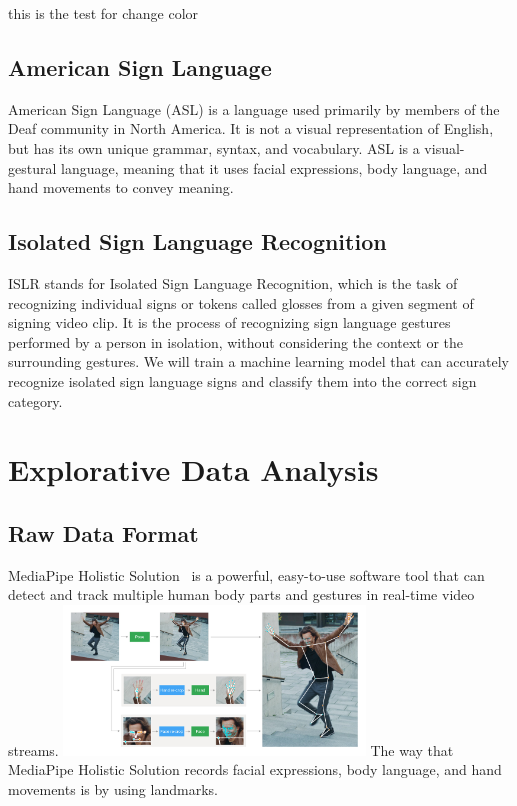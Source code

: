 \documentclass[10pt,twocolumn,letterpaper]{article}
\begin{document}
\begin{CJK*}{UTF8}{bsmi}
{\color{blue} this 
is the test for change 
color}

\subsection{American Sign Language}

American Sign Language (ASL) is a language used primarily by members of the Deaf community in North America. 
It is not a visual representation of English, but has its own unique grammar, syntax, and vocabulary. 
ASL is a visual-gestural language, meaning that it uses facial expressions, body language, and hand movements to convey meaning.

\subsection{Isolated Sign Language Recognition}

ISLR stands for Isolated Sign Language Recognition, which is the task of recognizing individual signs or tokens called glosses from a given segment of signing video clip.
It is the process of recognizing sign language gestures performed by a person in isolation, without considering the context or the surrounding gestures. 
We will train a machine learning model that can accurately recognize isolated sign language signs and classify them into the correct sign category.

\section{Explorative Data Analysis}
\label{sec:formatting}

\subsection{Raw Data Format}
MediaPipe Holistic Solution~\cite{https://doi.org/10.48550/arxiv.1906.08172} is a powerful, easy-to-use software tool that can detect and track multiple human body parts and gestures in real-time video streams. 
\includegraphics[width=80mm]{holistic_pipeline_example}
The way that MediaPipe Holistic Solution records facial expressions, body language, and hand movements is by using landmarks.


\end{CJK*}
\end{document}
